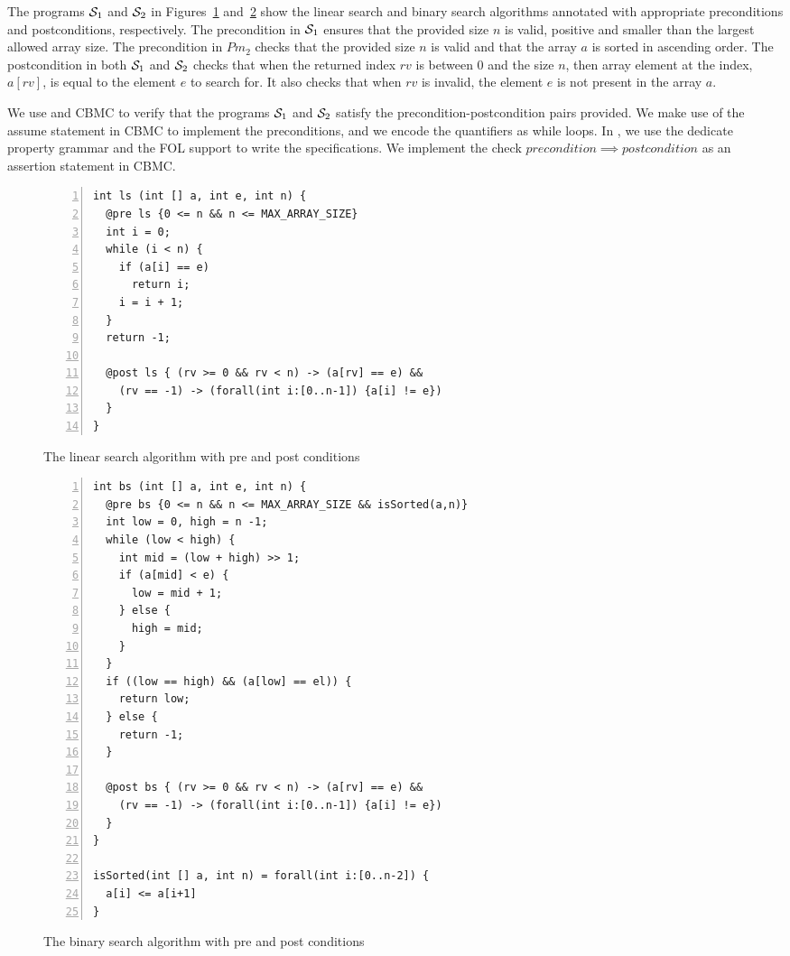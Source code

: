 The programs $\mathcal{S}_1$ and $\mathcal{S}_2$ in Figures~\ref{fig:linearsearch} and~\ref{fig:binarysearch}
show the linear search and binary search algorithms annotated with appropriate
preconditions and postconditions, respectively. The precondition in $\mathcal{S}_1$ ensures that 
the provided size $n$ is valid, \ie positive and smaller than the largest allowed array size. 
The precondition in $Pm_2$ checks that the provided size $n$ is valid and that the 
array $a$ is sorted in ascending order. 
The postcondition in both $\mathcal{S}_1$ and $\mathcal{S}_2$ 
checks that when the returned index $rv$ is between 0 and the size $n$, then 
array element at the index, $a[rv]$, is equal to the element $e$ to search for. It also 
checks that when $rv$ is invalid, the element $e$ is not present in the 
array $a$. 

We use \mytool{} and CBMC to verify that the programs $\mathcal{S}_1$ and $\mathcal{S}_2$ satisfy the 
precondition-postcondition pairs provided. We make use of the assume statement 
in CBMC to implement the preconditions, and we encode the quantifiers as while loops. 
In \mytool{}, we use the dedicate property grammar and the FOL support to write the specifications. 
We implement the check $precondition \implies postcondition$ as an assertion statement
in CBMC.

\begin{figure}[bt]
\begin{Verbatim}[fontsize=\relsize{-1.0}, numbersep=4pt,numbers=left]
int ls (int [] a, int e, int n) {
  @pre ls {0 <= n && n <= MAX_ARRAY_SIZE}
  int i = 0;
  while (i < n) {
    if (a[i] == e)
      return i;
    i = i + 1;  
  }
  return -1;
  
  @post ls { (rv >= 0 && rv < n) -> (a[rv] == e) &&
    (rv == -1) -> (forall(int i:[0..n-1]) {a[i] != e})
  }
}
\end{Verbatim}
\caption{The linear search algorithm with pre and post conditions}
\label{fig:linearsearch}
\end{figure}

\begin{figure}[bt]
\begin{Verbatim}[fontsize=\relsize{-1.0}, numbersep=4pt,numbers=left]
int bs (int [] a, int e, int n) {
  @pre bs {0 <= n && n <= MAX_ARRAY_SIZE && isSorted(a,n)}
  int low = 0, high = n -1;
  while (low < high) {
    int mid = (low + high) >> 1;
    if (a[mid] < e) {
      low = mid + 1;
    } else {
      high = mid;
    }
  }
  if ((low == high) && (a[low] == el)) {
    return low;
  } else {
    return -1;
  }
  
  @post bs { (rv >= 0 && rv < n) -> (a[rv] == e) &&
    (rv == -1) -> (forall(int i:[0..n-1]) {a[i] != e})
  }
}

isSorted(int [] a, int n) = forall(int i:[0..n-2]) {
  a[i] <= a[i+1]
}
\end{Verbatim}
\caption{The binary search algorithm with pre and post conditions}
\label{fig:binarysearch}
\end{figure}


